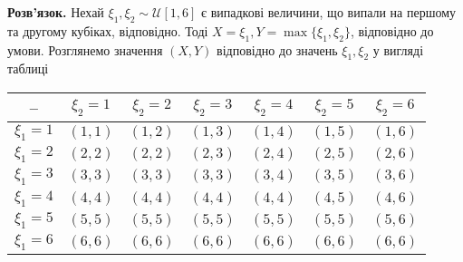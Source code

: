 \documentclass[14pt]{extarticle}
\begin{document}
\textbf{Розв'язок.} Нехай $\xi_1,\xi_2 \sim \mathcal{U}[1,6]$ є випадкові величини, що випали на першому та другому кубіках, відповідно. Тоді $X = \xi_1, Y = \max\{\xi_1,\xi_2\}$, відповідно до умови. Розглянемо значення $(X,Y)$ відповідно до значень $\xi_1,\xi_2$ у вигляді таблиці

\begin{center}
\begin{tabular}{ |c|c|c|c|c|c|c| } 
 \hline
 -- & $\xi_2=1$ & $\xi_2=2$ & $\xi_2=3$ & $\xi_2=4$ & $\xi_2=5$ & $\xi_2=6$ \\ 
 \hline
 $\xi_1=1$ & $(1,1)$ & $(1,2)$ & $(1,3)$ & $(1,4)$ & $(1,5)$ & $(1,6)$ \\ 
 \hline
 $\xi_1=2$ & $(2,2)$ & $(2,2)$ & $(2,3)$ & $(2,4)$ & $(2,5)$ & $(2,6)$ \\ 
 \hline
 $\xi_1=3$ & $(3,3)$ & $(3,3)$ & $(3,3)$ & $(3,4)$ & $(3,5)$ & $(3,6)$ \\
 \hline
 $\xi_1=4$ & $(4,4)$ & $(4,4)$ & $(4,4)$ & $(4,4)$ & $(4,5)$ & $(4,6)$ \\
 \hline
 $\xi_1=5$ & $(5,5)$ & $(5,5)$ & $(5,5)$ & $(5,5)$ & $(5,5)$ & $(5,6)$ \\
 \hline
 $\xi_1=6$ & $(6,6)$ & $(6,6)$ & $(6,6)$ & $(6,6)$ & $(6,6)$ & $(6,6)$ \\
 \hline
\end{tabular}
\end{center}
\end{document}
